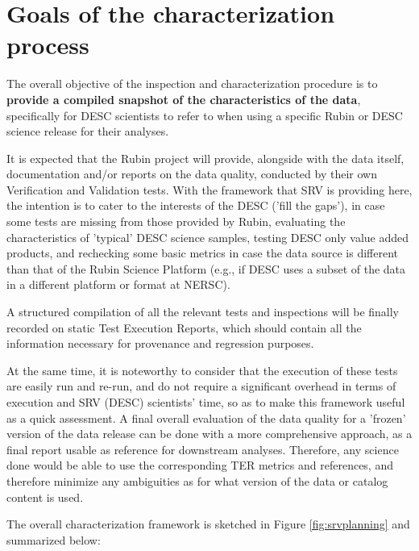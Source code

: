 \documentclass[12pt, a4paper]{article}
\begin{document}
\section{Goals of the characterization process}

The overall objective of the inspection and characterization procedure is to \textbf{provide a compiled snapshot of the characteristics of the data}, specifically for DESC scientists to refer to when using a specific Rubin or DESC science release for their analyses.

It is expected that the Rubin project will provide, alongside with the data itself, documentation and/or reports on the data quality, conducted by their own Verification and Validation tests. With the framework that SRV is providing here, the intention is to cater to the interests of the DESC ('fill the gaps'), in case some tests are missing from those provided by Rubin, evaluating the characteristics of 'typical' DESC science samples, testing DESC only value added products, and rechecking some basic metrics in case the data source is different than that of the Rubin Science Platform (e.g., if DESC uses a subset of the data in a different platform or format at NERSC).

A structured compilation of all the relevant tests and inspections will be finally recorded on static Test Execution Reports, which should contain all the information necessary for provenance and regression purposes.

At the same time, it is noteworthy to consider that the execution of these tests are easily run and re-run, and do not require a significant overhead in terms of execution and SRV (DESC) scientists' time, so as to make this framework useful as a quick assessment. A final overall evaluation of the data quality for a 'frozen' version of the data release can be done with a more comprehensive approach, as a final report usable as reference for downstream analyses. Therefore, any science done would be able to use the corresponding TER metrics and references, and therefore minimize any ambiguities as for what version of the data or catalog content is used.

The overall characterization framework is sketched in Figure \ref{fig:srvplanning} and summarized below:
\end{document}
